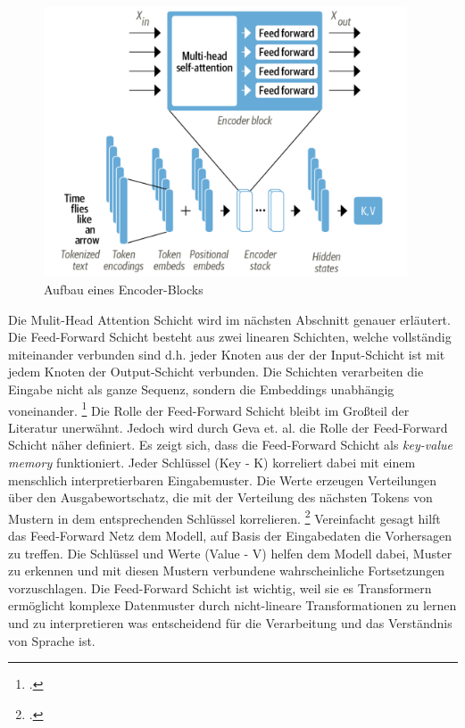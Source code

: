 \begin{figure}[h]
    \centering
    \includegraphics[height=80mm]{graphics/encoder-block.png}
    \caption[Aufbau eines Encoder-Blocks]{Aufbau eines Encoder-Blocks \footnotemark}
    \label{fig:encoder-block}
\end{figure}
Die Mulit-Head Attention Schicht wird im nächsten Abschnitt genauer erläutert. Die Feed-Forward Schicht besteht aus zwei linearen Schichten, welche vollständig miteinander verbunden sind d.h. jeder Knoten aus der der Input-Schicht ist mit jedem Knoten der Output-Schicht verbunden. Die Schichten verarbeiten die Eingabe nicht als ganze Sequenz, sondern die Embeddings unabhängig voneinander. \footcites[Vgl.][S. 70]{tunstall_natural_2022} Die Rolle der Feed-Forward Schicht bleibt im Großteil der Literatur unerwähnt. Jedoch wird durch Geva et. al. die Rolle der Feed-Forward Schicht näher definiert. Es zeigt sich, dass die Feed-Forward Schicht als \emph{key-value memory} funktioniert. Jeder Schlüssel (Key - K) korreliert dabei mit einem menschlich interpretierbaren Eingabemuster. Die Werte erzeugen Verteilungen über den Ausgabewortschatz, die mit der Verteilung des nächsten Tokens von Mustern in dem entsprechenden Schlüssel korrelieren. \footcites[Vgl. dazu ausführlich][S. 5484 ff.]  {geva_transformer_2020} Vereinfacht gesagt hilft das Feed-Forward Netz dem Modell, auf Basis der Eingabedaten die Vorhersagen zu treffen. Die Schlüssel und Werte (Value - V) helfen dem Modell dabei, Muster zu erkennen und mit diesen Mustern verbundene wahrscheinliche Fortsetzungen vorzuschlagen. Die Feed-Forward Schicht ist wichtig, weil sie es Transformern ermöglicht komplexe Datenmuster durch nicht-lineare Transformationen zu lernen und zu interpretieren was entscheidend für die Verarbeitung und das Verständnis von Sprache ist.
